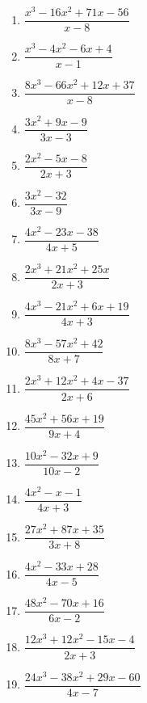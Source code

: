 \documentclass[12pt]{book}
\theoremstyle{definition}
\begin{document}
\begin{multicols}{3}
\begin{enumerate}
  \item $\dfrac{x^3 - 16 x^2 + 71 x - 56}{x - 8}$
  \item $\dfrac{x^3 - 4 x^2 - 6 x + 4}{x - 1}$
  \item $\dfrac{8 x^3 - 66 x^2 + 12 x + 37}{x - 8}$
  \item $\dfrac{3 x^2 + 9 x - 9}{3 x - 3}$
  \item $\dfrac{2 x^2 - 5 x - 8}{2 x + 3}$
  \item $\dfrac{3 x^2 - 32}{3 x - 9}$
  \item $\dfrac{4 x^2 - 23 x - 38}{4 x + 5}$
  \item $\dfrac{2 x^3 + 21 x^2 + 25 x}{2 x + 3}$
  \item $\dfrac{4 x^3 - 21 x^2 + 6 x + 19}{4 x + 3}$  
  \item $\dfrac{8 x^3 - 57 x^2 + 42}{8 x + 7}$
  \item $\dfrac{2 x^3 + 12 x^2 + 4 x - 37}{2 x + 6}$
  \item $\dfrac{45 x^2 + 56 x + 19}{9 x + 4}$
  \item $\dfrac{10 x^2 - 32 x + 9}{10 x - 2}$
  \item $\dfrac{4 x^2 - x - 1}{4 x + 3}$
  \item $\dfrac{27 x^2 + 87 x + 35}{3x + 8}$
  \item $\dfrac{4 x^2 - 33 x + 28}{4 x - 5}$
  \item $\dfrac{48 x^2 - 70 x + 16}{6 x - 2}$
  \item $\dfrac{12 x^3 + 12 x^2 - 15 x - 4}{2 x + 3}$
  \item $\dfrac{24 x^3 - 38 x^2 + 29 x - 60}{4 x - 7}$\label{polydiv_two}
	\end{enumerate}
\end{multicols}
\end{document}
